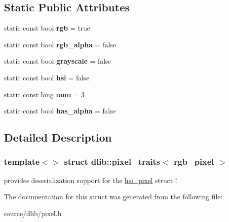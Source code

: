 \subsection*{Static Public Attributes}
\begin{DoxyCompactItemize}
\item 
\hypertarget{structdlib_1_1pixel__traits_3_01rgb__pixel_01_4_a0b79e04ebcd17ddbda0e53759e3dc1cb}{
static const bool {\bfseries rgb} = true}
\label{structdlib_1_1pixel__traits_3_01rgb__pixel_01_4_a0b79e04ebcd17ddbda0e53759e3dc1cb}

\item 
\hypertarget{structdlib_1_1pixel__traits_3_01rgb__pixel_01_4_a8c7b8ef75bac6d6b3a69a224cf9afde7}{
static const bool {\bfseries rgb\_\-alpha} = false}
\label{structdlib_1_1pixel__traits_3_01rgb__pixel_01_4_a8c7b8ef75bac6d6b3a69a224cf9afde7}

\item 
\hypertarget{structdlib_1_1pixel__traits_3_01rgb__pixel_01_4_aa5ce2a2349b380544692015776f0ca96}{
static const bool {\bfseries grayscale} = false}
\label{structdlib_1_1pixel__traits_3_01rgb__pixel_01_4_aa5ce2a2349b380544692015776f0ca96}

\item 
\hypertarget{structdlib_1_1pixel__traits_3_01rgb__pixel_01_4_ac9f647ad44676773637cca8d17f3fdf3}{
static const bool {\bfseries hsi} = false}
\label{structdlib_1_1pixel__traits_3_01rgb__pixel_01_4_ac9f647ad44676773637cca8d17f3fdf3}

\item 
\hypertarget{structdlib_1_1pixel__traits_3_01rgb__pixel_01_4_afe1a8263d3287379b2a6770f03fb38be}{
static const long {\bfseries num} = 3}
\label{structdlib_1_1pixel__traits_3_01rgb__pixel_01_4_afe1a8263d3287379b2a6770f03fb38be}

\item 
\hypertarget{structdlib_1_1pixel__traits_3_01rgb__pixel_01_4_a6cac7160f3fad29a6732f1158cba8268}{
static const bool {\bfseries has\_\-alpha} = false}
\label{structdlib_1_1pixel__traits_3_01rgb__pixel_01_4_a6cac7160f3fad29a6732f1158cba8268}

\end{DoxyCompactItemize}


\subsection{Detailed Description}
\subsubsection*{template$<$$>$ struct dlib::pixel\_\-traits$<$ rgb\_\-pixel $>$}

provides deserialization support for the \hyperlink{structdlib_1_1hsi__pixel}{hsi\_\-pixel} struct ! 

The documentation for this struct was generated from the following file:\begin{DoxyCompactItemize}
\item 
source/dlib/pixel.h\end{DoxyCompactItemize}
